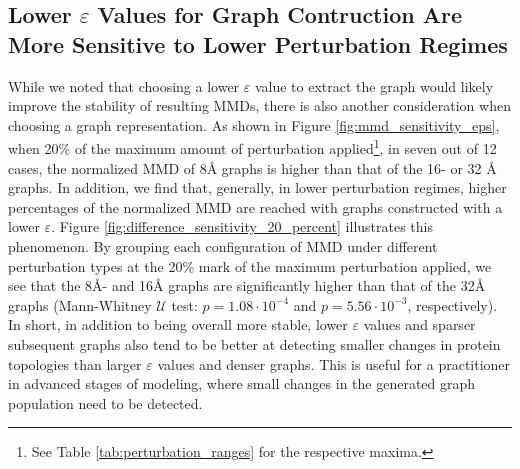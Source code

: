 \subsection{Lower $\varepsilon$ Values for Graph Contruction Are More
Sensitive to Lower Perturbation Regimes}\label{sec:sensitivity}
While we noted that choosing a lower $\varepsilon$ value
to extract the graph would likely improve the stability of resulting MMDs, there
is also another consideration when choosing a graph representation. As shown in
Figure \ref{fig:mmd_sensitivity_eps}, when 20\% of the maximum amount of
perturbation applied\footnote{See Table \ref{tab:perturbation_ranges} for the
respective maxima.}, in seven out of 12 cases, the normalized MMD of
8\si{\angstrom} graphs is higher than that of the 16- or 32 \si{\angstrom} graphs. In
addition, we find that, generally, in lower perturbation regimes, higher
percentages of the normalized MMD are reached with graphs constructed with a
lower $\varepsilon$. Figure \ref{fig:difference_sensitivity_20_percent}
illustrates this phenomenon. By grouping each configuration of MMD under
different perturbation types at the 20\% mark of the maximum perturbation
applied, we see that the 8\si{\angstrom}- and 16\si{\angstrom} graphs are
significantly higher than that of the 32\si{\angstrom} graphs (Mann-Whitney
$\mathcal{U}$ test: $p=1.08\cdot 10^{-4}$ and $p=5.56\cdot 10^{-3}$,
respectively). In short, in addition to being overall more stable, lower
$\varepsilon$ values and sparser subsequent graphs also tend to be better at
detecting smaller changes in protein topologies than larger $\varepsilon$ values
and denser graphs. This is useful for a practitioner in advanced stages of
modeling, where small changes in the generated graph population need to be
detected.


